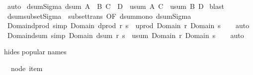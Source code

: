 \begin{isabellebody}
%
\isadelimproof
%
\endisadelimproof
%
\isatagproof
{}\isamarkupfalse%
\ auto%
\endisatagproof
{\isafoldproof}%
%
\isadelimproof
\isanewline
%
\endisadelimproof
\isanewline
{}\isamarkupfalse%
\ dsum{\isacharunderscore}Sigma{\isacharcolon}\ {\isachardoublequoteopen}{\isacharparenleft}dsum\ {\isacharparenleft}A\ {\isasymtimes}\ B{\isacharparenright}\ {\isacharparenleft}C\ {\isasymtimes}\ D{\isacharparenright}{\isacharparenright}\ {\isacharless}{\isacharequal}\ {\isacharparenleft}usum\ A\ C{\isacharparenright}\ {\isasymtimes}\ {\isacharparenleft}usum\ B\ D{\isacharparenright}{\isachardoublequoteclose}\isanewline
%
\isadelimproof
%
\endisadelimproof
%
\isatagproof
{}\isamarkupfalse%
\ blast%
\endisatagproof
{\isafoldproof}%
%
\isadelimproof
\isanewline
%
\endisadelimproof
\isanewline
{}\isamarkupfalse%
\ dsum{\isacharunderscore}subset{\isacharunderscore}Sigma\ {\isacharequal}\ subset{\isacharunderscore}trans\ {\isacharbrackleft}OF\ dsum{\isacharunderscore}mono\ dsum{\isacharunderscore}Sigma{\isacharbrackright}\isanewline
\isanewline
\isanewline
\isanewline
\isanewline
{}\isamarkupfalse%
\ Domain{\isacharunderscore}dprod\ {\isacharbrackleft}simp{\isacharbrackright}{\isacharcolon}\ {\isachardoublequoteopen}Domain\ {\isacharparenleft}dprod\ r\ s{\isacharparenright}\ {\isacharequal}\ uprod\ {\isacharparenleft}Domain\ r{\isacharparenright}\ {\isacharparenleft}Domain\ s{\isacharparenright}{\isachardoublequoteclose}\isanewline
%
\isadelimproof
\ \ %
\endisadelimproof
%
\isatagproof
{}\isamarkupfalse%
\ auto%
\endisatagproof
{\isafoldproof}%
%
\isadelimproof
\isanewline
%
\endisadelimproof
\isanewline
{}\isamarkupfalse%
\ Domain{\isacharunderscore}dsum\ {\isacharbrackleft}simp{\isacharbrackright}{\isacharcolon}\ {\isachardoublequoteopen}Domain\ {\isacharparenleft}dsum\ r\ s{\isacharparenright}\ {\isacharequal}\ usum\ {\isacharparenleft}Domain\ r{\isacharparenright}\ {\isacharparenleft}Domain\ s{\isacharparenright}{\isachardoublequoteclose}\isanewline
%
\isadelimproof
\ \ %
\endisadelimproof
%
\isatagproof
{}\isamarkupfalse%
\ auto%
\endisatagproof
{\isafoldproof}%
%
\isadelimproof
%
\endisadelimproof
%
\begin{isamarkuptext}%
hides popular names%
\end{isamarkuptext}\isamarkuptrue%
\isamarkupfalse%
\ {\isacharparenleft}\ node\ item\isanewline
{}\isamarkupfalse%

\end{isabellebody}
